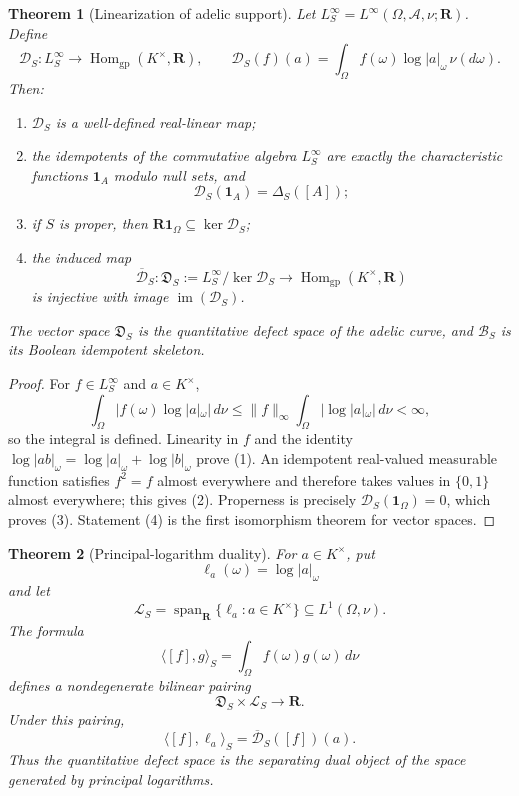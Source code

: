 \documentclass[11pt]{amsart}
\numberwithin{equation}{section}
\newtheorem{theorem}{Theorem}[section]
\theoremstyle{definition}
\newcommand{\R}{\mathbf R}
\newcommand{\Hom}{\operatorname{Hom}}
\begin{document}
\begin{theorem}[Linearization of adelic support]
\label{thm:adelic-defect-linearization}
Let $L^\infty_S=L^\infty(\Omega,\mathcal A,\nu;\R)$.  Define
\[
\mathscr D_S:L^\infty_S\longrightarrow
\Hom_{\mathrm{gp}}(K^\times,\R),
\qquad
\mathscr D_S(f)(a)
=\int_\Omega f(\omega)\log|a|_\omega\,\nu(d\omega).
\]
Then:
\begin{enumerate}[label=\textup{(\arabic*)}]
\item $\mathscr D_S$ is a well-defined real-linear map;
\item the idempotents of the commutative algebra $L^\infty_S$ are exactly
the characteristic functions $\mathbf1_A$ modulo null sets, and
\[
\mathscr D_S(\mathbf1_A)=\Delta_S([A]);
\]
\item if $S$ is proper, then $\R\mathbf1_\Omega\subseteq\ker\mathscr D_S$;
\item the induced map
\[
\overline{\mathscr D}_S:
\mathfrak D_S:=L^\infty_S/\ker\mathscr D_S
\longrightarrow
\Hom_{\mathrm{gp}}(K^\times,\R)
\]
is injective with image $\operatorname{im}(\mathscr D_S)$.
\end{enumerate}
The vector space $\mathfrak D_S$ is the quantitative defect space of the
adelic curve, and $\mathscr B_S$ is its Boolean idempotent skeleton.
\end{theorem}

\begin{proof}
For $f\in L^\infty_S$ and $a\in K^\times$,
\[
\int_\Omega |f(\omega)\log|a|_\omega|\,d\nu
\leq
\|f\|_\infty
\int_\Omega|\log|a|_\omega|\,d\nu<\infty,
\]
so the integral is defined.  Linearity in $f$ and the identity
$\log|ab|_\omega=\log|a|_\omega+\log|b|_\omega$ prove (1).
An idempotent real-valued measurable function satisfies $f^2=f$ almost
everywhere and therefore takes values in $\{0,1\}$ almost everywhere;
this gives (2).  Properness is precisely
$\mathscr D_S(\mathbf1_\Omega)=0$, which proves (3).  Statement (4) is the
first isomorphism theorem for vector spaces.
\end{proof}

\begin{theorem}[Principal-logarithm duality]
\label{thm:principal-logarithm-duality}
For $a\in K^\times$, put
\[
\ell_a(\omega)=\log|a|_\omega
\]
and let
\[
\mathscr L_S
=\operatorname{span}_{\R}\{\ell_a:a\in K^\times\}
\subseteq L^1(\Omega,\nu).
\]
The formula
\[
\langle[f],g\rangle_S=\int_\Omega f(\omega)g(\omega)\,d\nu
\]
defines a nondegenerate bilinear pairing
\[
\boxed{
\mathfrak D_S\times\mathscr L_S\longrightarrow\R.
}
\]
Under this pairing,
\[
\langle[f],\ell_a\rangle_S
=\overline{\mathscr D}_S([f])(a).
\]
Thus the quantitative defect space is the separating dual object of the
space generated by principal logarithms.
\end{theorem}
\end{document}
